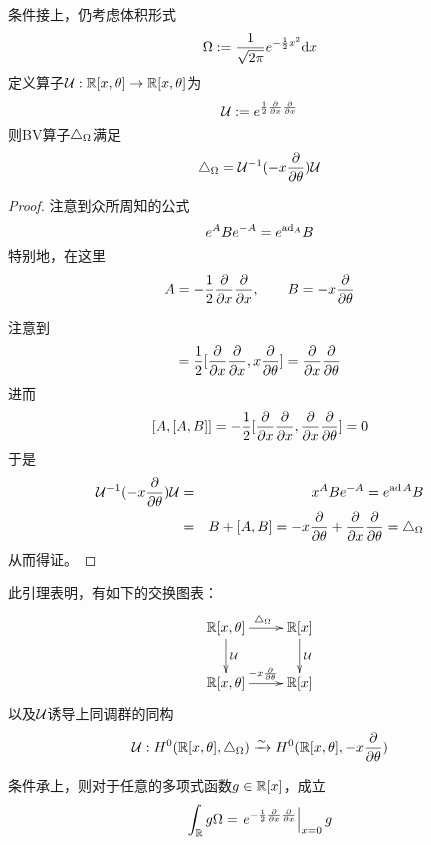 \begin{lemma}条件接上，仍考虑体积形式
$$\Omega:=\frac{1}{\sqrt{2\pi}}e^{-\frac{1}{2}x^2}\mathrm{d} x$$
定义算子$\mathcal{U}:\mathbb{R}[x,\theta]\to\mathbb{R}[x,\theta]$为
$$\mathcal{U}:=
  e^{\frac{1}{2}\frac{\partial } {\partial x}\frac{\partial } {\partial x}}$$
则BV算子$\triangle_\Omega$满足
$$\triangle_{\Omega}=\mathcal{U}^{-1}(-x\frac{\partial } {\partial \theta})\mathcal{U}$$
\end{lemma}

\begin{proof}注意到众所周知的公式%
$$e^ABe^{-A}=e^{\operatorname{ad}_A}B$$%
特别地，在这里%
$$A=-\frac{1}{2}\frac{\partial } {\partial x}\frac{\partial } {\partial x},\qquad B=-x\frac{\partial } {\partial \theta}$$%

注意到
\begin{eqnarray*}
[A,B]=
     \frac{1}{2}
     [\pp{x}\pp{x},x\pp{\theta}]
=    \pp{x}\pp{\theta}
\end{eqnarray*}
进而
$$[A,[A,B]]=-\frac{1}{2}[\frac{\partial } {\partial x}\frac{\partial } {\partial x},\frac{\partial } {\partial x}\frac{\partial } {\partial \theta}]=0$$
于是
\begin{eqnarray*}
     \mathcal{U}^{-1}(-x\frac{\partial } {\partial \theta})\mathcal{U}
&=&
     x^ABe^{-A}
 =
     e^{\operatorname{ad} A}B\\
&=&
     B+[A,B]
 =
     -x\frac{\partial } {\partial \theta}+\frac{\partial } {\partial x}\frac{\partial } {\partial \theta}
 =
     \triangle_\Omega
\end{eqnarray*}
从而得证。
\end{proof}

此引理表明，有如下的交换图表：
$$
  \xymatrix{
     \bbR[x,\theta] \ar[r]^{\yc_\Omg}  \ar[d]^{\mcalU}
    &\bbR[x]                           \ar[d]^{\mcalU}
  \\
     \bbR[x,\theta] \ar[r]^{-x\pp{\theta}}
    &\bbR[x]
  }
$$
以及$\mathcal{U}$诱导上同调群的同构
$$\mathcal{U}:H^0(\mathbb{R}[x,\theta],\triangle_\Omega)
\xrightarrow{\sim}H^0(\mathbb{R}[x,\theta],-x\frac{\partial } {\partial \theta})$$


\begin{prop}条件承上，则对于任意的多项式函数$g\in\mathbb{R}[x]$，成立
$$
  \int_{\mathbb{R}} g\Omega
=\left.
   e^{-\frac{1}{2}\frac{\partial } {\partial x}\frac{\partial } {\partial x}}
 \right|_{x=0}g
$$
\end{prop}

